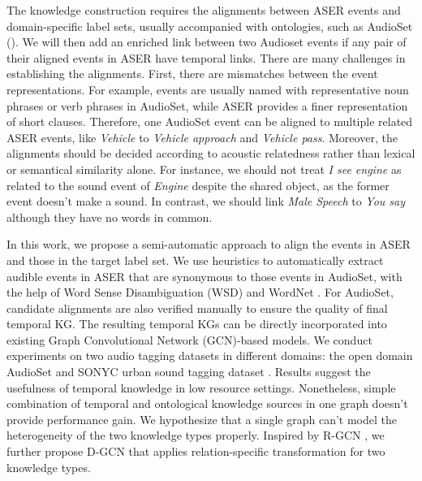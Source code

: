 The knowledge construction requires the alignments between ASER events and domain-specific 
label sets, usually accompanied with ontologies, such as AudioSet ().
We will then add an enriched link between two Audioset events if any pair of their aligned events in ASER have temporal links.
There are many challenges in establishing the alignments. 
First, there are mismatches between the event representations. For example, 
events are usually named with representative noun phrases or verb phrases in AudioSet, 
while ASER provides a finer representation of short clauses. 
Therefore, one AudioSet event can be aligned to multiple related ASER events, 
like \textit{Vehicle} to \textit{Vehicle approach} and \textit{Vehicle pass}. 
Moreover, the alignments should be decided according to acoustic relatedness rather 
than lexical or semantical similarity alone. For instance, we should not 
treat \textit{I see engine} as related to the sound event of \textit{Engine} 
despite the shared object, as the former event doesn't make a sound. In contrast, 
we should link \textit{Male Speech} to \textit{You say} although they have no words
in common.

In this work, we propose a semi-automatic approach to align the events in ASER and those in
the target label set. We use heuristics to automatically extract audible events in
ASER that are synonymous to those events in AudioSet, with the help of Word Sense Disambiguation (WSD) \citep{lesk1986automatic} and WordNet \citep{miller1995wordnet}. For AudioSet, candidate alignments are also verified
manually to ensure the quality of final temporal KG.
The resulting temporal KGs can be directly incorporated into existing Graph Convolutional Network (GCN)-based models. We conduct experiments on two audio tagging datasets in different domains: the open domain AudioSet \citep{gemmeke2017audio} and SONYC urban sound tagging dataset \citep{bello2019sonyc}. Results suggest the usefulness of temporal knowledge in low resource settings. Nonetheless, simple combination of temporal and ontological knowledge sources in one graph doesn't provide performance gain. We hypothesize that a single graph can't model the heterogeneity of the two knowledge types properly. Inspired by R-GCN \citep{schlichtkrull2018modeling}, we further propose D-GCN that applies relation-specific transformation for two knowledge types.

